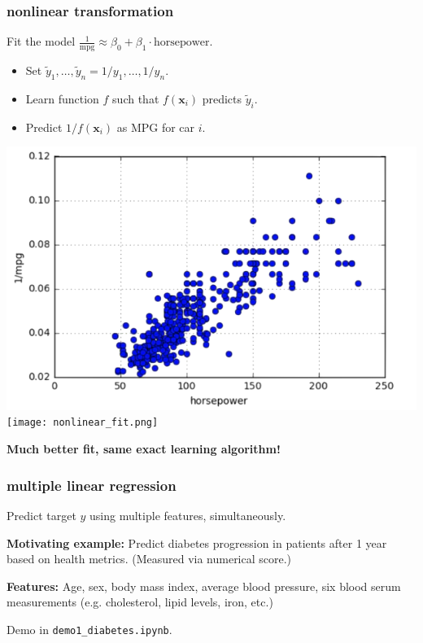 \documentclass[handout,compress]{beamer}
\newcommand{\bv}[1]{\mathbf{#1}}
\begin{document}
\begin{frame}[t]
	\frametitle{nonlinear transformation}
	Fit the model $\frac{1}{\text{mpg}} \approx \beta_0 + \beta_1\cdot \text{horsepower}$.
	
	\begin{itemize}
		\item Set $\tilde{y}_1, \ldots, \tilde{y}_n = 1/y_1, \ldots, 1/y_n$.
		\item Learn function $f$ such that $f(\bv{x}_i)$ predicts $\tilde{y}_i$.
		\item Predict $1/f(\bv{x}_i)$ as MPG for car $i$. 
	\end{itemize}

	\begin{center}
	\includegraphics[width=.45\textwidth]{oneovermpg.png}	\texttt{[image: nonlinear\_fit.png]}
	
	\textbf{Much better fit, same exact learning algorithm!}
	\end{center}
\end{frame}

\begin{frame}
	\frametitle{multiple linear regression}
	Predict target $y$ using multiple features, simultaneously.
	
	\textbf{Motivating example:} Predict diabetes progression in patients after 1 year based on health metrics. (Measured via numerical score.) \vspace{1em}
	
	\textbf{Features:} Age, sex, body mass index, average blood pressure, six blood serum measurements (e.g. cholesterol, lipid levels, iron, etc.)
	
	\begin{center}
		Demo in \texttt{demo1\_diabetes.ipynb}. 
	\end{center}
\end{frame}
\end{document}
